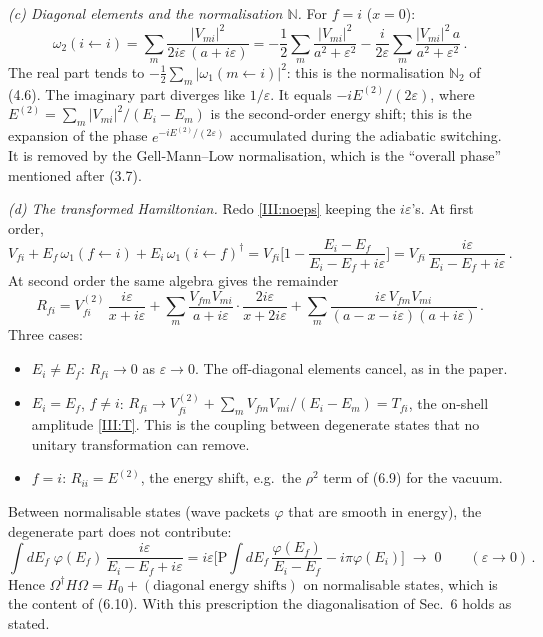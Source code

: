 \emph{(c) Diagonal elements and the normalisation $\mathbb N$.} For $f=i$ ($x=0$):
\[
\omega_2(i\!\leftarrow\! i)=\sum_m\frac{|V_{mi}|^2}{2i\varepsilon\,(a+i\varepsilon)}=-\frac12\sum_m\frac{|V_{mi}|^2}{a^2+\varepsilon^2}-\frac{i}{2\varepsilon}\sum_m\frac{|V_{mi}|^2\,a}{a^2+\varepsilon^2}\,.
\]
The real part tends to $-\frac12\sum_m|\omega_1(m\!\leftarrow\! i)|^2$: this is the normalisation $\mathbb N_2$ of (4.6). The imaginary part diverges like $1/\varepsilon$. It equals $-iE^{(2)}/(2\varepsilon)$, where $E^{(2)}=\sum_m|V_{mi}|^2/(E_i-E_m)$ is the second-order energy shift; this is the expansion of the phase $e^{-iE^{(2)}/(2\varepsilon)}$ accumulated during the adiabatic switching. It is removed by the Gell-Mann--Low normalisation, which is the ``overall phase'' mentioned after (3.7).

\emph{(d) The transformed Hamiltonian.} Redo \eqref{III:noeps} keeping the $i\varepsilon$'s. At first order,
\[
V_{fi}+E_f\,\omega_1(f\!\leftarrow\! i)+E_i\,\omega_1(i\!\leftarrow\! f)^\dagger=V_{fi}\Big[1-\frac{E_i-E_f}{E_i-E_f+i\varepsilon}\Big]=V_{fi}\,\frac{i\varepsilon}{E_i-E_f+i\varepsilon}\,.
\]
At second order the same algebra gives the remainder
\begin{equation}
R_{fi}=V^{(2)}_{fi}\,\frac{i\varepsilon}{x+i\varepsilon}+\sum_m\frac{V_{fm}V_{mi}}{a+i\varepsilon}\cdot\frac{2i\varepsilon}{x+2i\varepsilon}+\sum_m\frac{i\varepsilon\,V_{fm}V_{mi}}{(a-x-i\varepsilon)(a+i\varepsilon)}\,.
\label{III:R}
\end{equation}
Three cases:
\begin{itemize}[leftmargin=18pt,itemsep=2pt]
\item $E_i\neq E_f$: $R_{fi}\to0$ as $\varepsilon\to0$. The off-diagonal elements cancel, as in the paper.
\item $E_i=E_f$, $f\neq i$: $R_{fi}\to V^{(2)}_{fi}+\sum_mV_{fm}V_{mi}/(E_i-E_m)=T_{fi}$, the on-shell amplitude \eqref{III:T}. This is the coupling between degenerate states that no unitary transformation can remove.
\item $f=i$: $R_{ii}=E^{(2)}$, the energy shift, e.g.\ the $\rho^2$ term of (6.9) for the vacuum.
\end{itemize}
Between normalisable states (wave packets $\varphi$ that are smooth in energy), the degenerate part does not contribute:
\[
\int dE_f\;\varphi(E_f)\,\frac{i\varepsilon}{E_i-E_f+i\varepsilon}=i\varepsilon\Big[\mathrm P\!\!\int dE_f\,\frac{\varphi(E_f)}{E_i-E_f}-i\pi\varphi(E_i)\Big]\;\longrightarrow\;0\qquad(\varepsilon\to0)\,.
\]
Hence $\Omega^\dagger H\Omega=H_0+(\text{diagonal energy shifts})$ on normalisable states, which is the content of (6.10). With this prescription the diagonalisation of Sec.~6 holds as stated.

